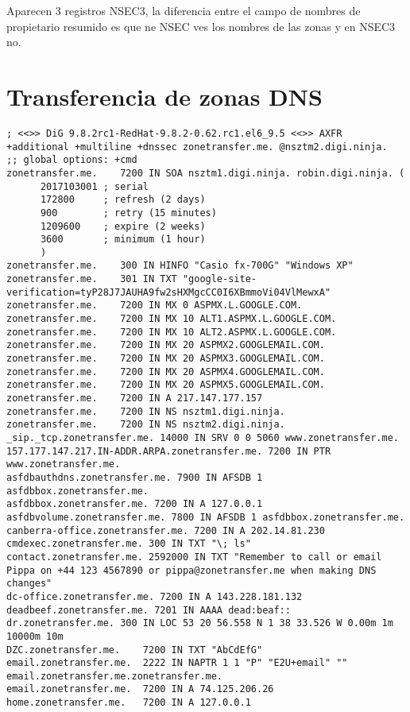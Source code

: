 \documentclass[11pt]{article}
\begin{document}
\medskip

Aparecen 3 registros NSEC3, la diferencia entre el campo de nombres de
propietario resumido es que ne NSEC ves los nombres de las zonas y en NSEC3 no.


\section{Transferencia de zonas DNS}

\begin{lstlisting}
; <<>> DiG 9.8.2rc1-RedHat-9.8.2-0.62.rc1.el6_9.5 <<>> AXFR +additional +multiline +dnssec zonetransfer.me. @nsztm2.digi.ninja.
;; global options: +cmd
zonetransfer.me.	7200 IN	SOA nsztm1.digi.ninja. robin.digi.ninja. (
      2017103001 ; serial
      172800     ; refresh (2 days)
      900        ; retry (15 minutes)
      1209600    ; expire (2 weeks)
      3600       ; minimum (1 hour)
      )
zonetransfer.me.	300 IN HINFO "Casio fx-700G" "Windows XP"
zonetransfer.me.	301 IN TXT "google-site-verification=tyP28J7JAUHA9fw2sHXMgcCC0I6XBmmoVi04VlMewxA"
zonetransfer.me.	7200 IN	MX 0 ASPMX.L.GOOGLE.COM.
zonetransfer.me.	7200 IN	MX 10 ALT1.ASPMX.L.GOOGLE.COM.
zonetransfer.me.	7200 IN	MX 10 ALT2.ASPMX.L.GOOGLE.COM.
zonetransfer.me.	7200 IN	MX 20 ASPMX2.GOOGLEMAIL.COM.
zonetransfer.me.	7200 IN	MX 20 ASPMX3.GOOGLEMAIL.COM.
zonetransfer.me.	7200 IN	MX 20 ASPMX4.GOOGLEMAIL.COM.
zonetransfer.me.	7200 IN	MX 20 ASPMX5.GOOGLEMAIL.COM.
zonetransfer.me.	7200 IN	A 217.147.177.157
zonetransfer.me.	7200 IN	NS nsztm1.digi.ninja.
zonetransfer.me.	7200 IN	NS nsztm2.digi.ninja.
_sip._tcp.zonetransfer.me. 14000 IN SRV	0 0 5060 www.zonetransfer.me.
157.177.147.217.IN-ADDR.ARPA.zonetransfer.me. 7200 IN PTR www.zonetransfer.me.
asfdbauthdns.zonetransfer.me. 7900 IN AFSDB 1 asfdbbox.zonetransfer.me.
asfdbbox.zonetransfer.me. 7200 IN A 127.0.0.1
asfdbvolume.zonetransfer.me. 7800 IN AFSDB 1 asfdbbox.zonetransfer.me.
canberra-office.zonetransfer.me. 7200 IN A 202.14.81.230
cmdexec.zonetransfer.me. 300 IN	TXT "\; ls"
contact.zonetransfer.me. 2592000 IN TXT	"Remember to call or email Pippa on +44 123 4567890 or pippa@zonetransfer.me when making DNS changes"
dc-office.zonetransfer.me. 7200	IN A 143.228.181.132
deadbeef.zonetransfer.me. 7201 IN AAAA dead:beaf::
dr.zonetransfer.me.	300 IN LOC 53 20 56.558 N 1 38 33.526 W 0.00m 1m 10000m 10m
DZC.zonetransfer.me.	7200 IN	TXT "AbCdEfG"
email.zonetransfer.me.	2222 IN	NAPTR 1 1 "P" "E2U+email" "" email.zonetransfer.me.zonetransfer.me.
email.zonetransfer.me.	7200 IN	A 74.125.206.26
home.zonetransfer.me.	7200 IN	A 127.0.0.1

\end{lstlisting}
\end{document}
